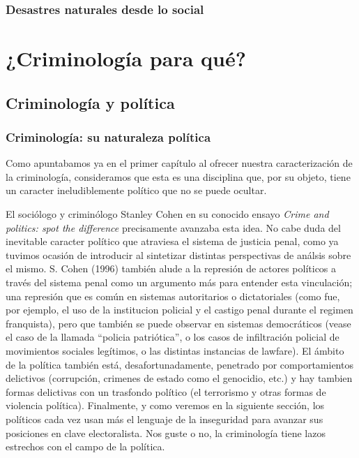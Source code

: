 \documentclass[
  spanish,
  letterpaper,
  DIV=11,
  numbers=noendperiod]{scrreprt}
\begin{document}
\section{Desastres naturales desde lo
social}\label{desastres-naturales-desde-lo-social}

\part{¿Criminología para qué?}

\chapter{Criminología y política}\label{criminologuxeda-y-poluxedtica-1}

\section{Criminología: su naturaleza
política}\label{criminologuxeda-su-naturaleza-poluxedtica}

Como apuntabamos ya en el primer capítulo al ofrecer nuestra
caracterización de la criminología, consideramos que esta es una
disciplina que, por su objeto, tiene un caracter ineludiblemente
político que no se puede ocultar.

El sociólogo y criminólogo Stanley Cohen en su conocido ensayo
\emph{Crime and politics: spot the difference} precisamente avanzaba
esta idea. No cabe duda del inevitable caracter político que atraviesa
el sistema de justicia penal, como ya tuvimos ocasión de introducir al
sintetizar distintas perspectivas de análsis sobre el mismo. S. Cohen
(1996) también alude a la represión de actores políticos a través del
sistema penal como un argumento más para entender esta vinculación; una
represión que es común en sistemas autoritarios o dictatoriales (como
fue, por ejemplo, el uso de la institucion policial y el castigo penal
durante el regimen franquista), pero que también se puede observar en
sistemas democráticos (vease el caso de la llamada ``policia
patriótica'', o los casos de infiltración policial de movimientos
sociales legítimos, o las distintas instancias de lawfare). El ámbito de
la política también está, desafortunadamente, penetrado por
comportamientos delictivos (corrupción, crimenes de estado como el
genocidio, etc.) y hay tambien formas delictivas con un trasfondo
político (el terrorismo y otras formas de violencia política).
Finalmente, y como veremos en la siguiente sección, los políticos cada
vez usan más el lenguaje de la inseguridad para avanzar sus posiciones
en clave electoralista. Nos guste o no, la criminología tiene lazos
estrechos con el campo de la política.
\end{document}
